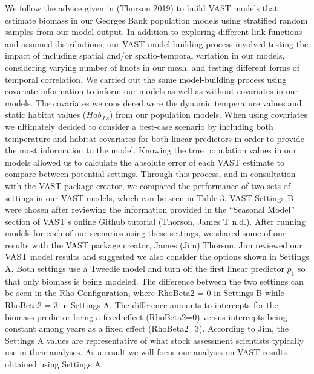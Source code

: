 \documentclass[
  12pt,
]{article}
\begin{document}
We follow the advice given in (Thorson 2019) to build VAST models that estimate biomass in our Georges Bank population models using stratified random samples from our model output. In addition to exploring different link functions and assumed distributions, our VAST model-building process involved testing the impact of including spatial and/or spatio-temporal variation in our models, considering varying number of knots in our mesh, and testing different forms of temporal correlation. We carried out the same model-building process using covariate information to inform our models as well as without covariates in our models. The covariates we considered were the dynamic temperature values and static habitat values (\(Hab_{J.s}\)) from our population models. When using covariates we ultimately decided to consider a best-case scenario by including both temperature and habitat covariates for both linear predictors in order to provide the most information to the model. Knowing the true population values in our models allowed us to calculate the absolute error of each VAST estimate to compare between potential settings. Through this process, and in consultation with the VAST package creator, we compared the performance of two sets of settings in our VAST models, which can be seen in Table 3. VAST Settings B were chosen after reviewing the information provided in the ``Seasonal Model'' section of VAST's online Github tutorial (Thorson, James T n.d.). After running models for each of our scenarios using these settings, we shared some of our results with the VAST package creator, James (Jim) Thorson. Jim reviewed our VAST model results and suggested we also consider the options shown in Settings A. Both settings use a Tweedie model and turn off the first linear predictor \(p_1\) so that only biomass is being modeled. The difference between the two settings can be seen in the Rho Configuration, where RhoBeta2 = 0 in Settings B while RhoBeta2 = 3 in Settings A. The difference amounts to intercepts for the biomass predictor being a fixed effect (RhoBeta2=0) versus intercepts being constant among years as a fixed effect (RhoBeta2=3). According to Jim, the Settings A values are representative of what stock assessment scientists typically use in their analyses. As a result we will focus our analysis on VAST results obtained using Settings A.
\end{document}
